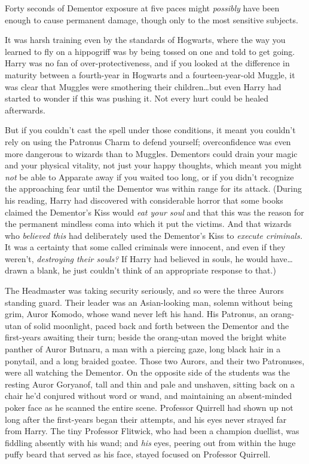 Forty seconds of Dementor exposure at five paces might \emph{possibly} have been enough to cause permanent damage, though only to the most sensitive subjects.

It was harsh training even by the standards of Hogwarts, where the way you learned to fly on a hippogriff was by being tossed on one and told to get going. Harry was no fan of over-protectiveness, and if you looked at the difference in maturity between a fourth-year in Hogwarts and a fourteen-year-old Muggle, it was clear that Muggles were smothering their children…but even Harry had started to wonder if this was pushing it. Not every hurt could be healed afterwards.

But if you couldn’t cast the spell under those conditions, it meant you couldn’t rely on using the Patronus Charm to defend yourself; overconfidence was even more dangerous to wizards than to Muggles. Dementors could drain your magic and your physical vitality, not just your happy thoughts, which meant you might \emph{not} be able to Apparate away if you waited too long, or if you didn’t recognize the approaching fear until the Dementor was within range for its attack. (During his reading, Harry had discovered with considerable horror that some books claimed the Dementor’s Kiss would \emph{eat your soul} and that this was the reason for the permanent mindless coma into which it put the victims. And that wizards who \emph{believed this} had deliberately used the Dementor’s Kiss to \emph{execute criminals.} It was a certainty that some called criminals were innocent, and even if they weren’t, \emph{destroying their souls?} If Harry had believed in souls, he would have…drawn a blank, he just couldn’t think of an appropriate response to that.)

The Headmaster was taking security seriously, and so were the three Aurors standing guard. Their leader was an Asian-looking man, solemn without being grim, Auror Komodo, whose wand never left his hand. His Patronus, an orang-utan of solid moonlight, paced back and forth between the Dementor and the first-years awaiting their turn; beside the orang-utan moved the bright white panther of Auror Butnaru, a man with a piercing gaze, long black hair in a ponytail, and a long braided goatee. Those two Aurors, and their two Patronuses, were all watching the Dementor. On the opposite side of the students was the resting Auror Goryanof, tall and thin and pale and unshaven, sitting back on a chair he’d conjured without word or wand, and maintaining an absent-minded poker face as he scanned the entire scene. Professor Quirrell had shown up not long after the first-years began their attempts, and his eyes never strayed far from Harry. The tiny Professor Flitwick, who had been a champion duellist, was fiddling absently with his wand; and \emph{his} eyes, peering out from within the huge puffy beard that served as his face, stayed focused on Professor Quirrell.

